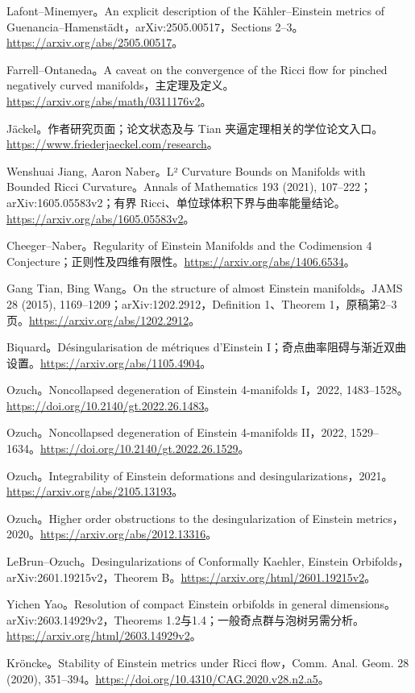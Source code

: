 \documentclass[11pt,a4paper]{article}
\theoremstyle{definition}
\begin{document}
\begin{enumerate}[label={[\arabic*]},leftmargin=2.2em,itemsep=0.55em]
\item Lafont--Minemyer。An explicit description of the Kähler--Einstein metrics of Guenancia--Hamenstädt，arXiv:2505.00517，Sections 2--3。\url{https://arxiv.org/abs/2505.00517}。
\item Farrell--Ontaneda。A caveat on the convergence of the Ricci flow for pinched negatively curved manifolds，主定理及定义。\url{https://arxiv.org/abs/math/0311176v2}。
\item Jäckel。作者研究页面；论文状态及与 Tian 夹逼定理相关的学位论文入口。\url{https://www.friederjaeckel.com/research}。
\item Wenshuai Jiang, Aaron Naber。L² Curvature Bounds on Manifolds with Bounded Ricci Curvature。Annals of Mathematics 193 (2021), 107--222；arXiv:1605.05583v2；有界 Ricci、单位球体积下界与曲率能量结论。\url{https://arxiv.org/abs/1605.05583v2}。
\item Cheeger--Naber。Regularity of Einstein Manifolds and the Codimension 4 Conjecture；正则性及四维有限性。\url{https://arxiv.org/abs/1406.6534}。
\item Gang Tian, Bing Wang。On the structure of almost Einstein manifolds。JAMS 28 (2015), 1169--1209；arXiv:1202.2912，Definition 1、Theorem 1，原稿第2--3页。\url{https://arxiv.org/abs/1202.2912}。
\item Biquard。Désingularisation de métriques d'Einstein I；奇点曲率阻碍与渐近双曲设置。\url{https://arxiv.org/abs/1105.4904}。
\item Ozuch。Noncollapsed degeneration of Einstein 4-manifolds I，2022, 1483--1528。\url{https://doi.org/10.2140/gt.2022.26.1483}。
\item Ozuch。Noncollapsed degeneration of Einstein 4-manifolds II，2022, 1529--1634。\url{https://doi.org/10.2140/gt.2022.26.1529}。
\item Ozuch。Integrability of Einstein deformations and desingularizations，2021。\url{https://arxiv.org/abs/2105.13193}。
\item Ozuch。Higher order obstructions to the desingularization of Einstein metrics，2020。\url{https://arxiv.org/abs/2012.13316}。
\item LeBrun--Ozuch。Desingularizations of Conformally Kaehler, Einstein Orbifolds，arXiv:2601.19215v2，Theorem B。\url{https://arxiv.org/html/2601.19215v2}。
\item Yichen Yao。Resolution of compact Einstein orbifolds in general dimensions。arXiv:2603.14929v2，Theorems 1.2与1.4；一般奇点群与泡树另需分析。\url{https://arxiv.org/html/2603.14929v2}。
\item Kröncke。Stability of Einstein metrics under Ricci flow，Comm. Anal. Geom. 28 (2020), 351--394。\url{https://doi.org/10.4310/CAG.2020.v28.n2.a5}。

\end{enumerate}
\end{document}
